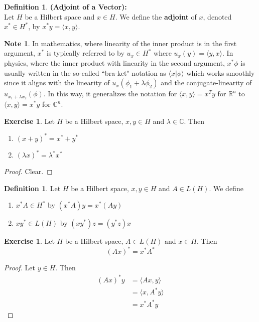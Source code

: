 \documentclass[12pt]{amsart}
\theoremstyle{definition}
\newtheorem{defn}[definition]{Definition}
\newtheorem{note}[definition]{Note}
\newtheorem{ex}[definition]{Exercise}
\newcommand{\lam}{\lambda}
\newcommand{\C}{\mathbb{C}}
\newcommand{\R}{\mathbb{R}}
\newcommand{\tbf}[1]{\textbf{#1}}
\renewcommand{\r}{\rangle}
\renewcommand{\l}{\langle}
\DeclareMathOperator*{\0}{\mbf{0}}
\DeclareMathOperator*{\1}{\mbf{1}}
\newcommand{\lex}[1]{\label{ex:#1}}
\newcommand{\ld}[1]{\label{defn:#1}}
\begin{document}
\begin{defn} \ld{}\tbf{(Adjoint of a Vector):} \\
	Let $H$ be a Hilbert space and $x \in H$. We define the \tbf{adjoint} of $x$, denoted $x^* \in H^*$, by $x^* y = \l x, y \r$. 
\end{defn}

\begin{note}
	In mathematics, where linearity of the inner product is in the first argument, $x^{*}$ is typically referred to by $u_{x} \in H^{*} $ where $u_{x}(y) = \l y, x\r$. In physics, where the inner product with linearity in the second argument, $x^{*} \phi$ is usually written in the so-called ``bra-ket" notation as $\l x | \phi \r$ which works smoothly since it aligns with the linearity of $u_{x}(\phi_1 + \lam \phi_2)$ and the conjugate-linearity of $u_{x_1 + \lam x_2}(\phi)$. In this way, it generalizes the notation for $\l x, y\r = x^T y$ for $\R^n$ to $\l x, y\r = x^*y$ for $\C^n$. 
\end{note}

\begin{ex} \lex{}
	Let $H$ be a Hilbert space, $x, y \in H$ and $\lam \in \C$. Then 
	\begin{enumerate}
		\item $(x + y)^* =  x^* + y^*$
		\item $(\lam x)^* = \lam^* x^*$
	\end{enumerate}
\end{ex}

\begin{proof}
	Clear.
\end{proof}

\begin{defn} \ld{}
	Let $H$ be a Hilbert space, $x, y \in H$ and $A \in L(H)$. We define 
	\begin{enumerate}
		\item $x^* A \in H^*$ by $(x^*A) y = x^*(A y)$
		\item $x y^* \in L(H)$ by $(x y^*) z = (y^*z) x$
	\end{enumerate}
\end{defn}

\begin{ex} \lex{}
	Let $H$ be a Hilbert space, $A \in L(H)$ and $x \in H$. Then $$(A x)^*= x^*A^*$$
\end{ex}

\begin{proof}
	Let $y \in H$. Then 
	\begin{align*}
		(Ax)^*	y 
		&= \l Ax, y \r \\
		&= \l x, A^* y \r \\
		&= x^*A^* y
	\end{align*}
\end{proof}
\end{document}
